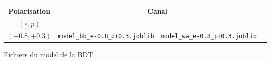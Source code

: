 

\begin{figure}[h!]
	\centering
	\begin{tabular}{ | c | c | c | c | }
		\hline
		Polarisation & \multicolumn{2}{c|}{Canal} \\
		\hline
		$(e,p)$ & \bb &  \WW \\
		\hline \cline{2-3}
		$(-0.8, +0.3)$ & \verb|model_bb_e-0.8_p+0.3.joblib| & \verb|model_ww_e-0.8_p+0.3.joblib| \\
		\hline
	\end{tabular}
	\label{files:model}
	\caption{Fichiers du model de la BDT.}
\end{figure}